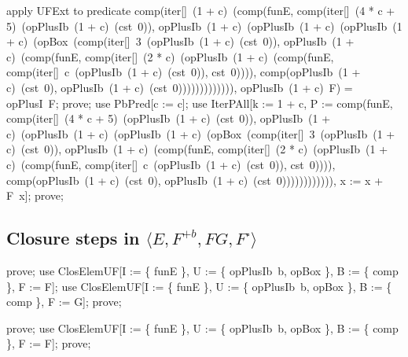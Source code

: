 \documentclass{article}
\begin{document}
\begin{zproof}
apply UFExt to predicate comp(iter[\nat]~(1 + c)~(comp(funE, comp(iter[\nat]~(4 * c + 5)~(opPlusIb~(1 + c)~(cst~0)), opPlusIb~(1 + c)~(opPlusIb~(1 + c)~(opPlusIb~(1 + c)~(opBox~(comp(iter[\nat]~3~(opPlusIb~(1 + c)~(cst~0)), opPlusIb~(1 + c)~(comp(funE, comp(iter[\nat]~(2 * c)~(opPlusIb~(1 + c)~(comp(funE, comp(iter[\nat]~c~(opPlusIb~(1 + c)~(cst~0)), cst~0)))), comp(opPlusIb~(1 + c)~(cst~0), opPlusIb~(1 + c)~(cst~0))))))))))))), opPlusIb~(1 + c)~F) = opPlusI~F;
prove;
use PbPred[c := c];
use IterPAll[k := 1 + c, P := comp(funE, comp(iter[\nat]~(4 * c + 5)~(opPlusIb~(1 + c)~(cst~0)), opPlusIb~(1 + c)~(opPlusIb~(1 + c)~(opPlusIb~(1 + c)~(opBox~(comp(iter[\nat]~3~(opPlusIb~(1 + c)~(cst~0)), opPlusIb~(1 + c)~(comp(funE, comp(iter[\nat]~(2 * c)~(opPlusIb~(1 + c)~(comp(funE, comp(iter[\nat]~c~(opPlusIb~(1 + c)~(cst~0)), cst~0)))), comp(opPlusIb~(1 + c)~(cst~0), opPlusIb~(1 + c)~(cst~0)))))))))))), x := x + F~x];
prove;
\end{zproof}

\subsection{Closure steps in $\langle E, F^{+b}, FG, F^\square \rangle$}


\begin{zproof}
prove;
use ClosElemUF[I := \{ funE \}, U := \{ opPlusIb~b, opBox \}, B := \{ comp \}, F := F];
use ClosElemUF[I := \{ funE \}, U := \{ opPlusIb~b, opBox \}, B := \{ comp \}, F := G];
prove;
\end{zproof}


\begin{zproof}
prove;
use ClosElemUF[I := \{ funE \}, U := \{ opPlusIb~b, opBox \}, B := \{ comp \}, F := F];
prove;
\end{zproof}
\end{document}
